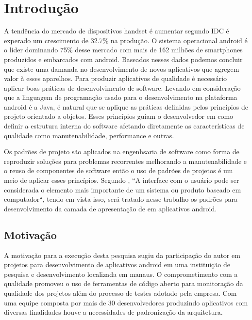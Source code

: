 \chapter{Introdução}

A tendência do mercado de dispositivos  handset é aumentar segundo IDC  é
experado um crescimento de 32.7\% na produção\cite{idc:a}. O sistema operacional
android é o líder dominando 75\% desse mercado com mais de 162 milhões de
smartphones produzidos e embarcados com android\cite{idc:b}. Baseados nesses
dados podemos concluir que existe uma damanda no desenvolvimento de novos 
aplicativos que agregem valor à esses aparelhos.
Para produzir aplicativos de qualidade é necessário aplicar boas práticas de
desenvolvimento de software. Levando em consideração que a linguagem de
programação usado para o desenvolvimento na plataforma android é a Java, é
natural que se aplique as práticas definidas pelos princípios de projeto
orientado a objetos. Esses princípios guiam o desenvolvedor em como definir a
estrutura interna do software afetando diretamente as características  de
qualidade como manutenabilidade, performance e outras\cite{tempero-di}.

Os padrões de projeto são aplicados na engenhsaria de software como forma de
reproduzir  soluções  para problemas recorrentes melhorando a manutenabilidade e
o reuso de componentes de software\cite{gof} então o uso de padrões de projetos
é um meio de aplicar esses princípios. Segundo , ``A
interface com o usuário pode ser considerada o elemento mais importante de
um sistema ou produto baseado em computador``, tendo em vista isso, será tratado
nesse trabalho  os padrões para desenvolvimento da camada de apresentação de 
em aplicativos android.

\section{Motivação}

A motivação para a execução desta pesquisa sugiu da participação do autor em
projetos para desenvolvimento de aplicativos android em uma instituição de
pesquisa e desenvolvimento localizada em manaus. O comprometimento com a
qualidade promoveu o uso de ferramentas de código aberto para monitoração da
qualidade dos projetos além do processo de testes adotado pela empresa. Com uma
equipe composta por mais de 30 desenvolvedores produzindo aplicativos com
diversas finalidades houve a necessidades de padronização da arquitetura.

